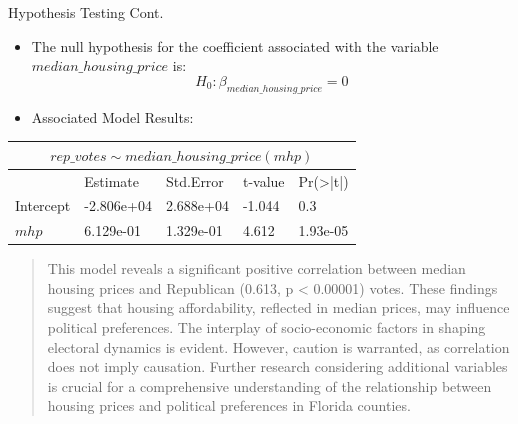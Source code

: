 \documentclass[xcolor=dvipsnames]{beamer}
\newlength{\onecolwid}
\newlength{\twocolwid}
\begin{document}
\begin{frame}[t]
\begin{columns}[t]
\begin{column}{\twocolwid}
\begin{columns}[t,totalwidth=\twocolwid]
\begin{column}{\onecolwid}

\begin{block}{Hypothesis Testing Cont.}

\begin{itemize}
\textbf{Linear Model:} 

$rep\_votes \sim median\_housing\_price$ \\ \newline
\item[\textcolor{black}{\textbullet}] The null hypothesis for the coefficient associated with the variable $median\_housing\_price$ is: \\
$$H_0: \beta_{median\_housing\_price} = 0$$
\item[\textcolor{black}{\textbullet}]Associated Model Results:

\end{itemize}    

\newline
\newline
\begin{tabular}{ |p{5.2cm}|p{5.9cm}|p{5cm}|p{4.2cm}|p{5cm}|}

 \hline
 \multicolumn{5}{|c|}{$rep\_votes \sim median\_housing\_price (mhp)$} \\
 \hline
 & Estimate &Std.Error &t-value & Pr(>|t|)\\
 \hline
 Intercept   & -2.806e+04    &2.688e+04&   -1.044  & 0.3\\
 \hline
 $mhp$ &   6.129e-01  &1.329e-01   &4.612 & 1.93e-05\\
 \hline
\end{tabular}
\newline

\begin{quote}
\textcolor{white}{\textbullet}This model reveals a significant positive correlation between median housing prices and Republican (0.613, p < 0.00001) votes. These findings suggest that housing affordability, reflected in median prices, may influence political preferences. The interplay of socio-economic factors in shaping electoral dynamics is evident. However, caution is warranted, as correlation does not imply causation. Further research considering additional variables is crucial for a comprehensive understanding of the relationship between housing prices and political preferences in Florida counties.



\end{quote}


\end{block}
\end{column}
\end{columns}
\end{column}
\end{columns}
\end{frame}
\end{document}

